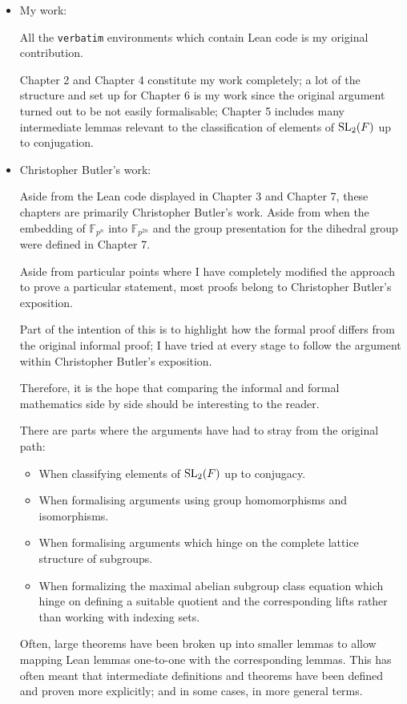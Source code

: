 \begin{itemize}
    \item My work:
    
    All the \texttt{verbatim} environments which contain Lean code is my original contribution.
    
    Chapter 2 and Chapter 4 constitute my work completely; a lot of the structure and set up for Chapter 6 is my work
    since the original argument turned out to be not easily formalisable; Chapter 5 includes many intermediate lemmas relevant
    to the classification of elements of $\operatorname{SL}_2(F)$ up to conjugation.


    \item Christopher Butler's work:
    
    Aside from the Lean code displayed in Chapter 3 and Chapter 7, these chapters are primarily Christopher Butler's work. Aside from
    when the embedding of $\mathbb{F}_{p^n}$ into $\mathbb{F}_{p^{2n}}$ and the group presentation for the dihedral group were defined 
    in Chapter 7.
    
    Aside from particular points where I have completely modified the approach to prove a particular statement, most proofs belong to Christopher Butler's exposition.
    
    Part of the intention of this is to highlight how the formal proof differs from the 
    original informal proof; I have tried at every stage to follow the argument within Christopher Butler's exposition. 
    
    Therefore, it is the hope that comparing the informal and formal mathematics side by side should be interesting to the reader.

    There are parts where the arguments have had to stray from the original path:
    
    \begin{itemize}
        \item When classifying elements of $\operatorname{SL}_2(F)$ up to conjugacy.
        \item When formalising arguments using group homomorphisms and isomorphisms.
        \item When formalising arguments which hinge on the complete lattice structure of subgroups.
        \item When formalizing the maximal abelian subgroup class equation which hinge on defining
        a suitable quotient and the corresponding lifts rather than working with indexing sets.
    \end{itemize}
    
    Often, large theorems have been broken up into smaller lemmas to allow mapping Lean lemmas one-to-one with the corresponding lemmas. 
    This has often meant that intermediate definitions and theorems have been defined and proven more explicitly; and in some cases, 
    in more general terms.
\end{itemize}


